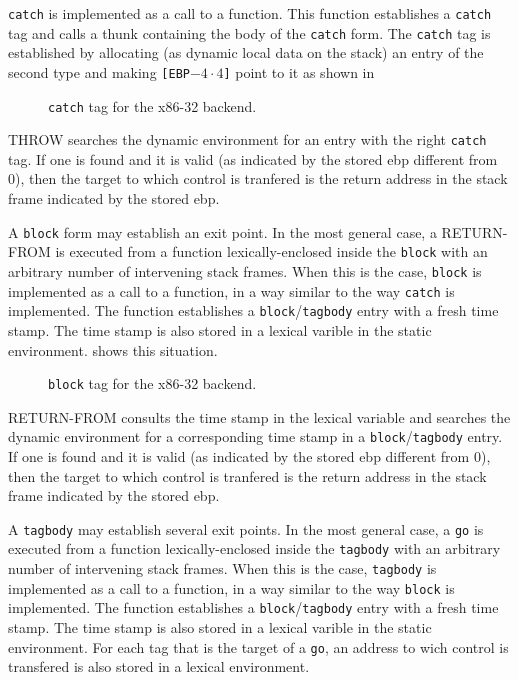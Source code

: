 \texttt{catch} is implemented as a call to a function.  This function
establishes a \texttt{catch} tag and calls a thunk containing the body
of the \texttt{catch} form.  The \texttt{catch} tag is established by
allocating (as dynamic local data on the stack) an entry of the second
type and making \texttt{[EBP$-4 \cdot 4$]} point to it as shown in

\begin{figure}
\begin{center}
\end{center}
\caption{\label{fig-x86-32-catch}
\texttt{catch} tag for the x86-32 backend.}
\end{figure}

THROW searches the dynamic environment for an entry with the right
\texttt{catch} tag.  If one is found and it is valid (as indicated by
the stored ebp different from 0), then the target to which control is
tranfered is the return address in the stack frame indicated by the
stored ebp.

A \texttt{block} form may establish an exit point.  In the most
general case, a RETURN-FROM is executed from a function
lexically-enclosed inside the \texttt{block} with an arbitrary number
of intervening stack frames.  When this is the case, \texttt{block} is
implemented as a call to a function, in a way similar to the way
\texttt{catch} is implemented.  The function establishes a
\texttt{block}/\texttt{tagbody} entry with a fresh time stamp.  The
time stamp is also stored in a lexical varible in the static
environment.   shows this situation.

\begin{figure}
\begin{center}
\end{center}
\caption{\label{fig-x86-32-block-tag}
\texttt{block} tag for the x86-32 backend.}
\end{figure}

RETURN-FROM consults the time stamp in the lexical variable and
searches the dynamic environment for a corresponding time stamp in a
\texttt{block}/\texttt{tagbody} entry.  If one is found and it is
valid (as indicated by the stored ebp different from 0), then the
target to which control is tranfered is the return address in the
stack frame indicated by the stored ebp.

A \texttt{tagbody} may establish several exit points.  In the most
general case, a \texttt{go} is executed from a function
lexically-enclosed inside the \texttt{tagbody} with an arbitrary
number of intervening stack frames.  When this is the case,
\texttt{tagbody} is implemented as a call to a function, in a way
similar to the way \texttt{block} is implemented.  The function
establishes a \texttt{block}/\texttt{tagbody} entry with a fresh time
stamp.  The time stamp is also stored in a lexical varible in the
static environment.  For each tag that is the target of a \texttt{go},
an address to wich control is transfered is also stored in a lexical
environment.

